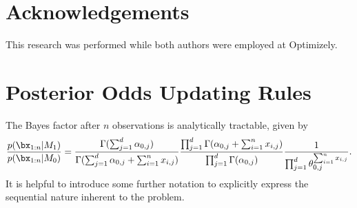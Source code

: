 \documentclass[11pt]{article}
\begin{document}
\section{Acknowledgements}
This research was performed while both authors were employed at Optimizely.





\appendix
\section{Posterior Odds Updating Rules}
\label{app:posterior_odds}
The Bayes factor after $n$ observations is analytically tractable, given by
\begin{equation}
  \label{eq:bayes_factor}
 \frac{p(\bx_{1:n}|M_1)}{p(\bx_{1:n}|M_0)} = \frac{\Gamma(\sum_{j=1}^{d} \alpha_{0,j})}{\Gamma(\sum_{j=1}^{d} \alpha_{0,j} + \sum_{i=1}^{n}x_{i,j})}\frac{\prod_{j=1}^{d}\Gamma(\alpha_{0,j} + \sum_{i=1}^{n}x_{i,j} )}{\prod_{j=1}^{d}\Gamma(\alpha_{0,j} )}\frac{1}{\prod_{j=1}^{d} \theta_{0,j}^{\sum_{i=1}^{n}x_{i,j}}}.
\end{equation}
It is helpful to introduce some further notation to explicitly express the sequential nature inherent to the problem.
\end{document}
